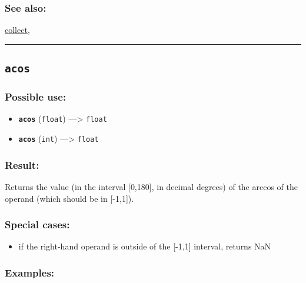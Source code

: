 \documentclass[]{book}
\providecommand{\tightlist}{%
  \setlength{\itemsep}{0pt}\setlength{\parskip}{0pt}}
\theoremstyle{definition}
\theoremstyle{definition}
\theoremstyle{definition}
\theoremstyle{remark}
\begin{document}
\subsubsection{See also:}\label{see-also-14}

\href{OperatorsBC\#collect}{collect},

\begin{center}\rule{0.5\linewidth}{\linethickness}\end{center}

\subsection{\texorpdfstring{\texttt{acos}}{acos}}\label{acos}

\subsubsection{Possible use:}\label{possible-use-18}

\begin{itemize}
\tightlist
\item
  \textbf{\texttt{acos}} (\texttt{float}) ---\textgreater{}
  \texttt{float}
\item
  \textbf{\texttt{acos}} (\texttt{int}) ---\textgreater{} \texttt{float}
\end{itemize}

\subsubsection{Result:}\label{result-17}

Returns the value (in the interval {[}0,180{]}, in decimal degrees) of
the arccos of the operand (which should be in {[}-1,1{]}).

\subsubsection{Special cases:}\label{special-cases-13}

\begin{itemize}
\tightlist
\item
  if the right-hand operand is outside of the {[}-1,1{]} interval,
  returns NaN
\end{itemize}

\subsubsection{Examples:}\label{examples-14}
\end{document}
